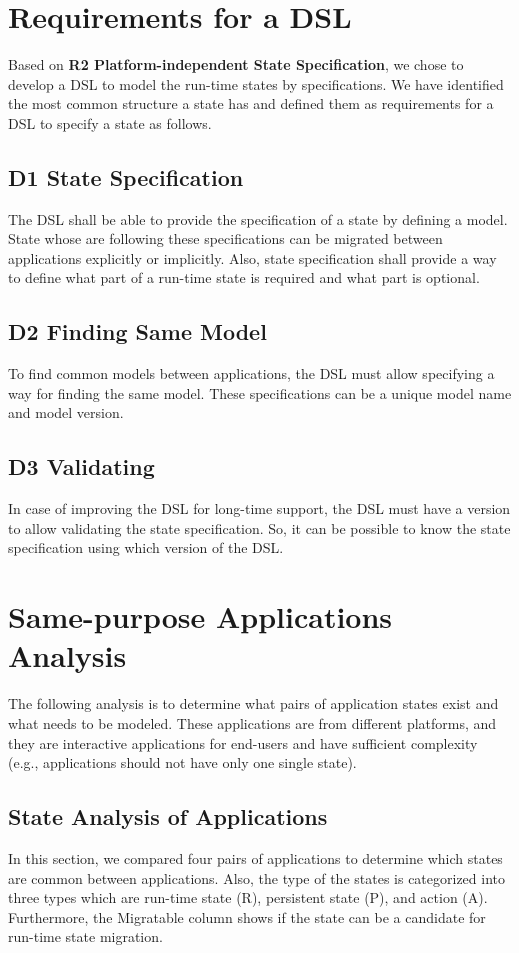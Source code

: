 \section{Requirements for a DSL}
Based on \textbf{R2 Platform-independent State Specification}, we chose to develop a DSL to model the run-time states by specifications. 
We have identified the most common structure a state has and defined them as requirements for a DSL to specify a state as follows.


\subsection{D1 State Specification}
The DSL shall be able to provide the specification of a state by defining a model. State whose are following these specifications can be migrated between applications explicitly or implicitly. Also, state specification shall provide a way to define what part of a run-time state is required and what part is optional.

\subsection{D2 Finding Same Model}
To find common models between applications, the DSL must allow specifying a way for finding the same model. These specifications can be a unique model name and model version.

\subsection{D3 Validating}    
In case of improving the DSL for long-time support, the DSL must have a version to allow validating the state specification. So, it can be possible to know the state specification using which version of the DSL.



\section{Same-purpose Applications Analysis}
The following analysis is to determine what pairs of application states exist and what needs to be modeled.
These applications are from different platforms, and they are interactive applications for end-users and have sufficient complexity (e.g., applications should not have only one single state).


\subsection{State Analysis of Applications}
In this section, we compared four pairs of applications to determine which states are common between applications. Also, the type of the states is categorized into three types which are run-time state (R), persistent state (P), and action (A). Furthermore, the Migratable column shows if the state can be a candidate for run-time state migration.

